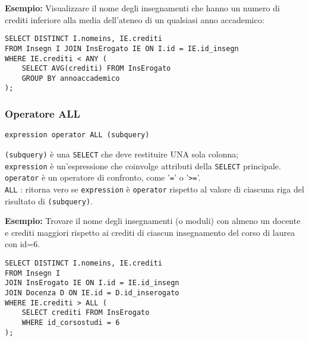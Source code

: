 \documentclass[a4paper, 10pt, titlepage]{article}
\begin{document}
		\textbf{Esempio:} Visualizzare il nome degli insegnamenti che hanno un numero di crediti
		inferiore alla media dell’ateneo di un qualsiasi anno accademico:
		\begin{lstlisting}
SELECT DISTINCT I.nomeins, IE.crediti
FROM Insegn I JOIN InsErogato IE ON I.id = IE.id_insegn
WHERE IE.crediti < ANY (
    SELECT AVG(crediti) FROM InsErogato
    GROUP BY annoaccademico
);
		\end{lstlisting}
		\medskip 
	\subsubsection{Operatore ALL}
		\begin{lstlisting}
expression operator ALL (subquery)
		\end{lstlisting}
		\noindent
		\lstinline|(subquery)| è una \lstinline|SELECT| che deve restituire UNA sola colonna;\\
		\lstinline|expression| è un’espressione che coinvolge attributi della \lstinline|SELECT|
		principale.\\
		\lstinline|operator| è un operatore di confronto, come ’\lstinline|=|’ o ’\lstinline|>=|’.\\
		\lstinline|ALL| : ritorna vero se \lstinline|expression| è \lstinline|operator| rispetto al valore di ciascuna riga del risultato di \lstinline|(subquery)|. \medskip 
		
		
		\textbf{Esempio:} Trovare il nome degli insegnamenti (o moduli) con almeno un docente e
		crediti maggiori rispetto ai crediti di ciascun insegnamento del corso di laurea
		con id=6.
		\begin{lstlisting}
SELECT DISTINCT I.nomeins, IE.crediti
FROM Insegn I
JOIN InsErogato IE ON I.id = IE.id_insegn
JOIN Docenza D ON IE.id = D.id_inserogato
WHERE IE.crediti > ALL (
    SELECT crediti FROM InsErogato
    WHERE id_corsostudi = 6
);
		\end{lstlisting}
		
\end{document}

